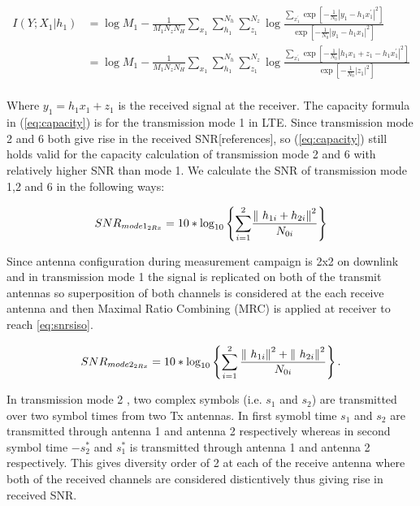 \documentclass[a4paper,10pt]{article}
\begin{document}
\begin{align}
I\left(Y;X_{1}|h_{1}\right)
&=\log M_{1}-\frac{1}{M_{1}N_{z}N_{H}}\sum_{x_{1}}\sum_{h_1}^{N_{h}}\sum_{z_{1}}^{N_{z}}\log\frac{\sum_{x^{'}_{1}}\exp\left[-\frac{1}{N_{0}}\left|y_{1}-h_{1}x^{'}_{1}\right|^2\right]}{\exp\left[-\frac{1}{N_{0}}\left|y_{1}-h_{1}x_{1}\right|^{2}\right]}\nonumber\\
&=\log M_{1}-\frac{1}{M_{1}N_{z}N_{H}}\sum_{x_{1}}\sum_{h_1}^{N_{h}}\sum_{z_{1}}^{N_{z}}\log\frac{\sum_{x^{'}_{1}}\exp\left[-\frac{1}{N_{0}}\left|h_{1}x_{1} + z_1 - h_1x^{'}_{1}\right|^2\right]}{\exp\left[-\frac{1}{N_{0}}\left|z_{1}\right|^{2}\right]}\nonumber\\
\label{eq:capacity}
\end{align}

Where $y_1 = h_1x_1 + z_1$ is the received signal at the receiver. The capacity formula in (\ref{eq:capacity}) is for the transmission mode 1 in LTE. Since transmission mode 2 and 6 both give rise in the received SNR[references], so (\ref{eq:capacity}) still holds valid for the capacity calculation of transmission mode 2 and 6 with relatively higher SNR than mode 1. We calculate the SNR of transmission mode 1,2 and 6 in the following ways:

\begin{equation} \label{eq:snrsiso}
SNR_{mode1_{2Rx}} = 10*{\mathrm{log}}_{10} \left\lbrace {\sum_{i=1}^2} {\frac{{\| \ {h_{1i}} + {h_{2i}} \| \\}^2}{N_{0i}}}\right\rbrace
\end{equation}

Since antenna configuration during measurement campaign is 2x2 on downlink and in transmission mode 1 the signal is replicated on both of the transmit antennas so superposition of both channels is considered at the each receive antenna and then Maximal Ratio Combining (MRC) is applied at receiver to reach \ref{eq:snrsiso}. 
 
\begin{equation} \label{eq:snralam}
SNR_{mode2_{2Rx}} = 10* {\mathrm{log}}_{10} \left\lbrace {\sum_{i=1}^2} \, {\frac{ {\| \ {h_{1i}} \| \\}^2 +  {\| \ {h_{2i}} \| \\}^2 }{N_{0i}}}\right\rbrace. 
\end{equation}

In transmission mode 2 , two complex symbols (i.e. $s_1$ and $s_2$) are transmitted over two symbol times from two Tx antennas. In first symobl time $s_1$ and $s_2$ are transmitted through antenna 1 and antenna 2 respectively whereas in second symbol time $-{s_{2}^{*}}$ and ${s_{1}^{*}}$ is transmitted through antenna 1 and antenna 2 respectively. This gives diversity order of 2 at each of the receive antenna where both of the received channels are considered disticntively thus giving rise in received SNR. 
\end{document}
